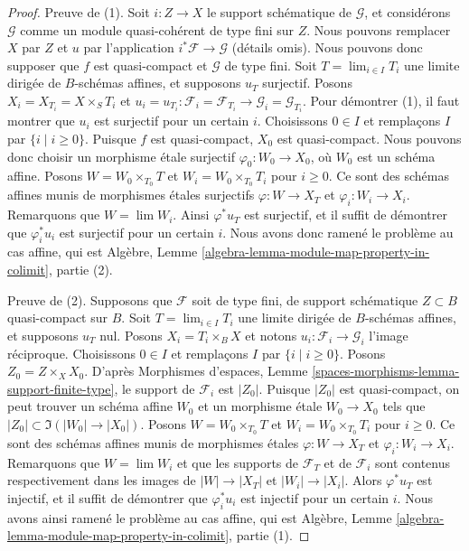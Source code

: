 \begin{proof}
Preuve de (1). Soit $i : Z \to X$ le support schématique de
$\mathcal{G}$, et considérons $\mathcal{G}$ comme un module quasi-cohérent
de type fini sur $Z$. Nous pouvons remplacer $X$ par $Z$ et $u$ par l'application
$i^*\mathcal{F} \to \mathcal{G}$ (détails omis). Nous pouvons donc supposer que
$f$ est quasi-compact et $\mathcal{G}$ de type fini.
Soit $T = \lim_{i \in I} T_i$ une limite dirigée de $B$-schémas affines,
et supposons $u_T$ surjectif.
Posons $X_i = X_{T_i} = X \times_S T_i$ et
$u_i = u_{T_i} : \mathcal{F}_i = \mathcal{F}_{T_i}
\to \mathcal{G}_i = \mathcal{G}_{T_i}$.
Pour démontrer (1), il faut montrer que $u_i$ est surjectif pour un certain $i$.
Choisissons $0 \in I$ et remplaçons $I$ par $\{i \mid i \geq 0\}$.
Puisque $f$ est quasi-compact, $X_0$ est quasi-compact.
Nous pouvons donc choisir un morphisme \'etale surjectif $\varphi_0 : W_0 \to X_0$,
où $W_0$ est un schéma affine. Posons $W = W_0 \times_{T_0} T$
et $W_i = W_0 \times_{T_0} T_i$ pour $i \geq 0$. Ce
sont des schémas affines munis
de morphismes \'etales surjectifs $\varphi : W \to X_T$ et
$\varphi_i : W_i \to X_i$. Remarquons que $W = \lim W_i$.
Ainsi $\varphi^*u_T$ est surjectif, et il suffit de démontrer que
$\varphi_i^*u_i$ est surjectif pour un certain $i$. Nous avons donc ramené
le problème au cas affine, qui est
Algèbre, Lemme \ref{algebra-lemma-module-map-property-in-colimit}, partie (2).

\medskip\noindent
Preuve de (2). Supposons que $\mathcal{F}$ soit de type fini, de support
schématique $Z \subset B$ quasi-compact sur $B$. Soit $T = \lim_{i \in I} T_i$
une limite dirigée de $B$-schémas affines, et supposons $u_T$ nul.
Posons $X_i = T_i \times_B X$ et notons $u_i : \mathcal{F}_i \to \mathcal{G}_i$
l'image réciproque. Choisissons $0 \in I$ et remplaçons $I$ par
$\{i \mid i \geq 0\}$. Posons $Z_0 = Z \times_X X_0$. D'après
Morphismes d'espaces, Lemme \ref{spaces-morphisms-lemma-support-finite-type},
le support de $\mathcal{F}_i$ est $|Z_0|$. Puisque $|Z_0|$ est quasi-compact,
on peut trouver un schéma affine $W_0$ et un morphisme \'etale $W_0 \to X_0$
tels que $|Z_0| \subset \Im(|W_0| \to |X_0|)$.
Posons $W = W_0 \times_{T_0} T$ et $W_i = W_0 \times_{T_0} T_i$ pour $i \geq 0$.
Ce sont des schémas affines munis
de morphismes \'etales $\varphi : W \to X_T$ et
$\varphi_i : W_i \to X_i$. Remarquons que $W = \lim W_i$
et que les supports de $\mathcal{F}_T$ et de $\mathcal{F}_i$
sont contenus respectivement dans les images de $|W| \to |X_T|$ et $|W_i| \to |X_i|$.
Alors $\varphi^*u_T$ est injectif, et il suffit de démontrer que
$\varphi_i^*u_i$ est injectif pour un certain $i$.
Nous avons ainsi ramené le problème au cas affine, qui est
Algèbre, Lemme \ref{algebra-lemma-module-map-property-in-colimit}, partie (1).


\end{proof}
